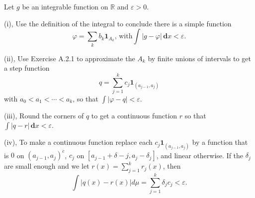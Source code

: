 \documentclass[en, normal, 11pt, black]{elegantnote}
\newenvironment{exercise}[1]{\begin{tcolorbox}[colback=black!15, colframe=black!80, breakable, title=#1]}{\end{tcolorbox}}
\newcommand{\der}{\,\mathbf{d}}
\begin{document}
        
        

    \begin{exercise}{1.4.3}
        Let $g$ be an integrable function on $\mathbb{R}$ and $\varepsilon>0$. 
        
        (i), Use the definition of the integral to conclude there is a simple function 
        \[
            \varphi=\sum_{k} b_{k} \mathbf{1}_{A_{k}},\,\text{with}\int|g-\varphi| \der x<\varepsilon. 
        \]
        
        (ii), Use Exercise A.2.1 to approximate the $A_{k}$ by finite unions of intervals to get a step function 
        \[
            q=\sum_{j=1}^{k} c_{j} \mathbf{1}_{\left(a_{j-1}, a_{j}\right)}
        \]
        with $a_{0}<a_{1}<\cdots<a_{k}$, so that $\int|\varphi-q|<\varepsilon$. 
        
        (iii), Round the corners of $q$ to get a continuous function $r$ so that $\int|q-r| \der x<\varepsilon$. 


        (iv), To make a continuous function replace each $c_{j} \mathbf{1}_{\left(a_{j-1}, a_{j}\right)}$ by a function that is $0$ on $\left(a_{j-1}, a_{j}\right)^{c}$, $c_{j}$ on $\left[a_{j-1}+\delta-j, a_{j}-\delta_{j}\right]$, and linear otherwise. If the $\delta_{j}$ are small enough and we let $r(x)=\sum_{j=1}^{k} r_{j}(x)$, then
        \[
            \int|q(x)-r(x)| d \mu=\sum_{j=1}^{k} \delta_{j} c_{j}<\varepsilon. 
        \]
    \end{exercise}
\end{document}
